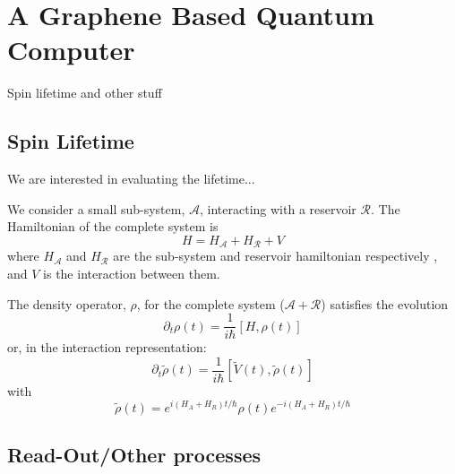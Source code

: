 \chapter{A Graphene Based Quantum Computer}
Spin lifetime and other stuff

\section{Spin Lifetime}
We are interested in evaluating the lifetime...

We consider a small sub-system, $\mathcal{A}$, interacting with a reservoir $\mathcal{R}$. The Hamiltonian of the complete system is
\begin{equation}
  H = H_{\mathcal{A}} + H_{\mathcal{R}} + V
\end{equation}
where $H_{\mathcal{A}}$ and $H_{\mathcal{R}}$ are the sub-system and reservoir hamiltonian respectively , and $V$ is the interaction between them.

The density operator, $\rho$, for the complete system ($\mathcal{A} + \mathcal{R}$) satisfies the evolution
\begin{equation}
  \partial_t \rho(t) = \frac{1}{i\hbar}\left[H,\rho(t)\right]
\end{equation}
or, in the interaction representation:
\begin{equation}
  \partial_t \tilde{\rho}(t) =
  \frac{1}{i\hbar}\left[\tilde{V}(t),\tilde{\rho}(t)\right]
\end{equation}
with
\begin{equation}
  \tilde{\rho}(t) = e^{i(H_A+H_R)t/\hbar} \rho(t) e^{-i(H_A+H_R)t/\hbar}
\end{equation}



\section{Read-Out/Other processes}
